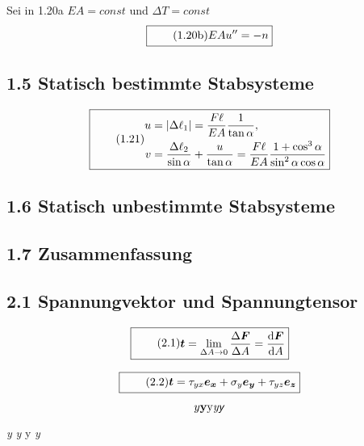 \documentclass[11pt]{article}
\newcommand{\1}{ {\mathds{1}} }
\newcommand{\abs}[1]{\lvert#1\rvert}
\begin{document}
    Sei in 1.20a $EA = const$ und $\Delta T = const$
    \begin{equation}
      \boxed{
        \tag{1.20b}
        \begin{split}
          EA u''
          =
          -n
        \end{split}
      }
    \end{equation}


    \subsection*{1.5 Statisch bestimmte Stabsysteme}

    \begin{equation}
      \boxed{
        \tag{1.21}
        \begin{split}
          u
          &=
          \abs{\Delta\ell_1}
          =
          \frac{F\ell}{EA}
          \frac{1}{\tan{\alpha}}
          ,\\
          v
          &=
          \frac{\Delta\ell_2}{\sin{\alpha}}
          +
          \frac{u}{\tan{\alpha}}
          =
          \frac{F\ell}{EA}
          \frac{1 + \cos^3\alpha}{\sin^2\alpha \cos \alpha}
        \end{split}
      }
    \end{equation}


    \subsection*{1.6 Statisch unbestimmte Stabsysteme}

    \subsection*{1.7 Zusammenfassung}
    
    \subsection*{2.1 Spannungvektor und Spannungtensor}

    \begin{equation}
      \boxed{
        \tag{2.1}
        \begin{split}
          \boldsymbol{t}
          =
          \lim_{\Delta A \rightarrow 0}
          \frac{\Delta \boldsymbol{F}}{\Delta A}
          =
          \frac{\text{d}\boldsymbol{F}}{\text{d}A}
        \end{split}
      }
    \end{equation}

    \begin{equation}
      \boxed{
        \tag{2.2}
        \begin{split}
          \boldsymbol{t}
          =
          \tau_{yx} \boldsymbol{e_x}
          +
          \sigma_y  \boldsymbol{e_y}
          +
          \tau_{yz} \boldsymbol{e_z}
        \end{split}
      }
    \end{equation}

    \[y\mathbf{y}\text{y}\textit{y}\textsf{\textit{y}}\]

    \textit{y}
    \textit{\textsf{y}}
    \textsf{y}
    \textsf{\textit{y}}
\end{document}
